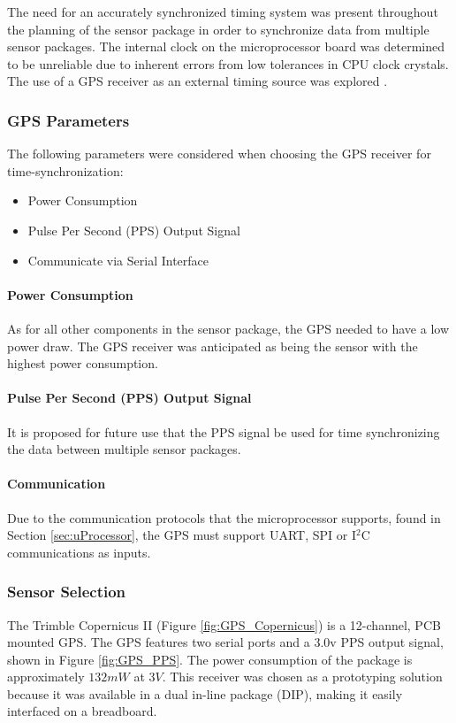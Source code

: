 \indent The need for an accurately synchronized timing system was present throughout the planning of the sensor package in order to synchronize data from
multiple sensor packages. The internal clock on the microprocessor board was determined to be unreliable due to inherent errors from low tolerances in CPU
clock crystals. The use of a GPS receiver as an external timing source was explored \cite{GPSTimeSync}.
\subsubsection{GPS Parameters}
\label{sec:GPS_Parameters}
\indent The following parameters were considered when choosing the GPS receiver for time-synchronization:
\begin{itemize}
\item Power Consumption 
\item Pulse Per Second (PPS) Output Signal
\item Communicate via Serial Interface
\end{itemize}
\paragraph{Power Consumption}
\label{sec:GPS_power_cons.}
\indent As for all other components in the sensor package, the GPS needed to have a low power draw. The GPS receiver was anticipated as being the sensor
with the highest power consumption.
%
\paragraph{Pulse Per Second (PPS) Output Signal}
\label{sec:gps_out_ch_num}
\indent It is proposed for future use that the PPS signal be used for time synchronizing the data between multiple sensor packages.

\paragraph{Communication}
\label{sec:gps_comm}
\indent Due to the communication protocols that the microprocessor supports, found in Section \ref{sec:uProcessor}, the GPS must support UART, SPI or
I$^{2}$C communications as inputs.

\subsubsection{Sensor Selection}
\label{sec:GPS_Trimble}
\indent The Trimble Copernicus II (Figure \ref{fig:GPS_Copernicus}) is a 12-channel, PCB mounted GPS. The GPS features two serial ports and a 3.0v PPS
output signal, shown in Figure \ref{fig:GPS_PPS}. The power consumption of the package is approximately $132mW$ at $3V$. This receiver was chosen as a
prototyping solution because it was available in a dual in-line package (DIP), making it easily interfaced on a breadboard. 

